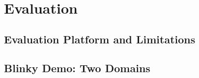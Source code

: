 \section{Evaluation}
\label{sec:evaluation}


\subsection{Evaluation Platform and Limitations}
\label{sub:platform}


\subsection{Blinky Demo: Two Domains}
\label{sub:blinky}


